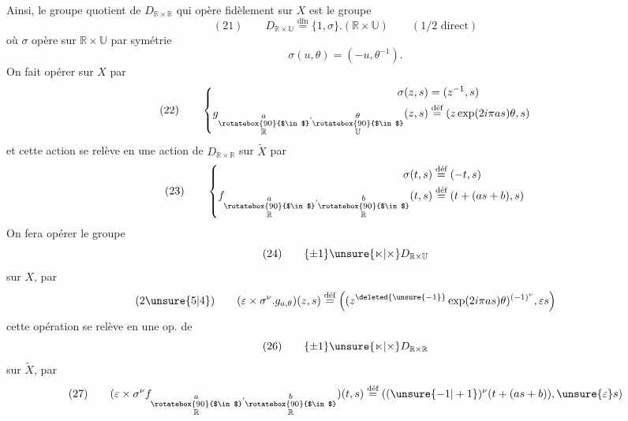 Ainsi, le groupe quotient de $D_{\mathbb R\times\mathbb R}$ qui opère fidèlement sur $X$ est le groupe
\[
(21)\qquad D_{\mathbb R\times\mathbb U}\overset{\mathrm{dfn}}{=}\{1,\sigma\}.(\mathbb R\times\mathbb U)\qquad(1/2\text{ direct})
\]
où $\sigma$ opère  sur $\mathbb R\times\mathbb U$ par symétrie
\[
\sigma(u,\theta)=(-u,\theta^{-1}).
\]
On fait opérer   sur $X$ par
\[
(22)\qquad\left\{\begin{aligned}
\sigma(z,s)&=(z^{-1},s)\\
g_{\underset{\substack{\rotatebox{90}{$\in$}\\\mathbb R}}{a},\underset{\substack{\rotatebox{90}{$\in$}\\\mathbb U}}{\theta}}(z,s)&\overset{\text{déf}}{=}(z\exp(2i\pi as)\theta,s)
\end{aligned}\right.
\]
et cette action se relève en une action de $D_{\mathbb R\times\mathbb R}$ sur $\widetilde X$ par
\[
(23)\qquad\left\{\begin{aligned}
\sigma(t,s)&\overset{\text{déf}}{=}(-t,s)\\
f_{\underset{\substack{\rotatebox{90}{$\in$}\\\mathbb R}}{a},\underset{\substack{\rotatebox{90}{$\in$}\\\mathbb R}}{b}}(t,s)&\overset{\text{déf}}{=}(t+(as+b),s)
\end{aligned}\right.
\]
 On fera opérer le groupe
\[
(24)\qquad\{\pm1\}\unsure{\ltimes|\times}D_{\mathbb R\times\mathbb U}
\]
sur $X$, par
\[
(2\unsure{5|4})\qquad (\varepsilon\times\sigma^\nu.g_{a,\theta})(z,s)\overset{\text{déf}}{=}\left((z^{\deleted{\unsure{-1}}}\exp(2i\pi as)\theta)^{(-1)^\nu},\varepsilon s\right)
\]
cette opération se relève en une op. de
\[
(26)\qquad\{\pm1\}\unsure{\ltimes|\times}D_{\mathbb R\times\mathbb R}
\]
sur $\widetilde X$, par
\[
(27)\qquad (\varepsilon\times\sigma^\nu f_{\underset{\substack{\rotatebox{90}{$\in$}\\\mathbb R}}{a},\underset{\substack{\rotatebox{90}{$\in$}\\\mathbb R}}{b}})(t,s)\overset{\text{déf}}{=}\left((\unsure{-1|+1})^\nu(t+(as+b)),\unsure{\varepsilon}s\right)
\]


